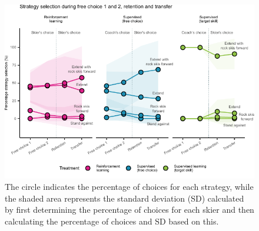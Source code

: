 \documentclass[pdflatex,sn-mathphys-num]{sn-jnl}%
\theoremstyle{thmstyleone}%
\theoremstyle{thmstyletwo}%
\theoremstyle{thmstylethree}%
\begin{document}
\begin{figure}[H]
\centering
\includegraphics{figures/figure_choice_descriptivecount_4.pdf}
\caption{The circle indicates the percentage of choices for each strategy, while the shaded area represents the standard deviation (SD) calculated by first determining the percentage of choices for each skier and then calculating the percentage of choices and SD based on this.}\label{fig: choice_descriptives}
\end{figure}
\end{document}
